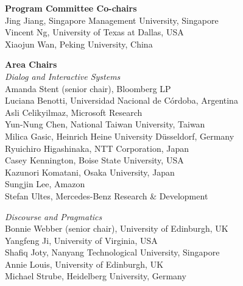 \vspace*{0.5cm}

{\bf Program Committee Co-chairs} \\
Jing Jiang, Singapore Management University, Singapore \\
Vincent Ng, University of Texas at Dallas, USA \\
Xiaojun Wan, Peking University, China

{\bf Area Chairs} \\
\emph{Dialog and Interactive Systems} \\
\hspace*{0.2in}Amanda Stent (senior chair), Bloomberg LP \\ 
\hspace*{0.2in}Luciana Benotti, Universidad Nacional de Córdoba, Argentina\\ 
\hspace*{0.2in}Asli Celikyilmaz, Microsoft Research \\
\hspace*{0.2in}Yun-Nung Chen, National Taiwan University, Taiwan \\
\hspace*{0.2in}Milica Gasic, Heinrich Heine University Düsseldorf, Germany \\
\hspace*{0.2in}Ryuichiro Higashinaka, NTT Corporation, Japan \\
\hspace*{0.2in}Casey Kennington, Boise State University, USA \\
\hspace*{0.2in}Kazunori Komatani, Osaka University, Japan \\
\hspace*{0.2in}Sungjin Lee, Amazon \\
\hspace*{0.2in}Stefan Ultes, Mercedes-Benz Research \& Development


\emph{Discourse and Pragmatics} \\
\hspace*{0.2in}Bonnie Webber (senior chair), University of Edinburgh, UK \\ 
\hspace*{0.2in}Yangfeng Ji, University of Virginia, USA \\
\hspace*{0.2in}Shafiq Joty, Nanyang Technological University, Singapore \\
\hspace*{0.2in}Annie Louis, University of Edinburgh, UK \\
\hspace*{0.2in}Michael Strube, Heidelberg University, Germany


